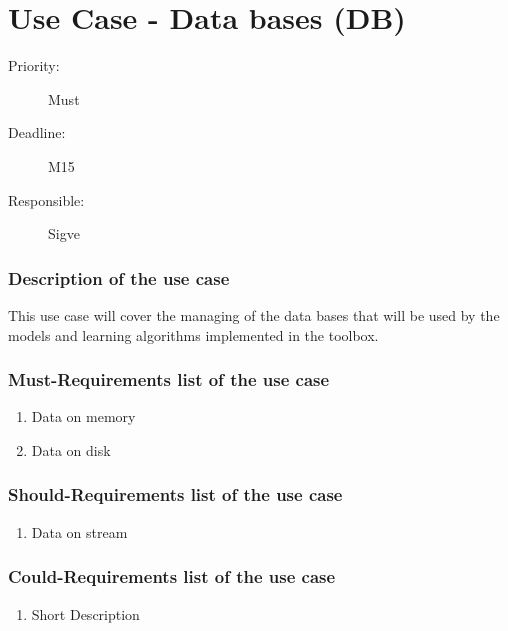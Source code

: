 \newpage
\section{Use Case - Data bases (DB)}
\label{UseCase:DB}

\begin{description}
\item[Priority:] Must
\item[Deadline:] M15
\item[Responsible:] Sigve
\end{description}

\subsubsection*{Description of the use case}

This use case will cover the managing of the data bases that will be used by the models and learning algorithms implemented in the toolbox.  

\subsubsection*{Must-Requirements list of the use case}

\begin{enumerate}
\item Data on memory
\item Data on disk
\end{enumerate}

\subsubsection*{Should-Requirements list of the use case}

\begin{enumerate}
\item Data on stream
\end{enumerate}

\subsubsection*{Could-Requirements list of the use case}

\begin{enumerate}
\item Short Description
\end{enumerate}


